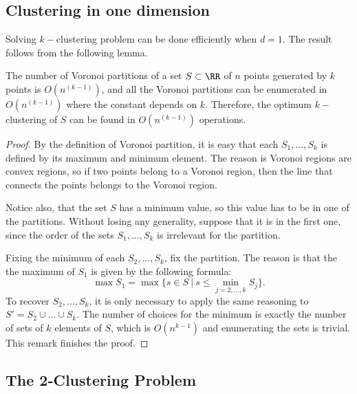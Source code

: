 \subsection{Clustering in one dimension}
\label{sec:subsecOneDimension}

Solving $k-$clustering problem can be done efficiently when $d=1$. The result follows from 
the following lemma.
\begin{lemma}
\label{lem:CountingKClustering}
  The number of Voronoi partitions of a set $S\subset\RR$ of $n$ points 
  generated by $k$ points is $O(n^{(k-1)})$, and all the Voronoi partitions
  can be enumerated in $O(n^{(k-1)})$ where the constant depends on $k$. Therefore,
  the optimum $k-$clustering of $S$ can be found in $O(n^{(k-1)})$ operations.
\end{lemma}
\begin{proof}
  By the definition of Voronoi partition, it is easy that each $S_1,\ldots, S_k$ is 
  defined by its maximum and minimum element. The reason is  Voronoi regions 
  are convex regions, so if two points belong to a Voronoi region, then the line
  that connects the points belongs to the Voronoi region.
  
  Notice also, that the set $S$ has a minimum value, so this value has to be in 
  one of the partitions. Without losing any generality, suppose that it is in the 
  first one, since the order of the sets $S_1,\ldots, S_k$ is irrelevant for the 
  partition.
  
  Fixing the minimum of each $S_2,\ldots, S_k$, fix the partition. The reason is
  that the the maximum of $S_1$ is given by the following formula:
  \begin{equation*}
    \max S_1=\max\{s\in S\ |\ s\le\min_{j=2,\ldots,k} S_j\}.
  \end{equation*}
  To recover $S_2,\ldots, S_k$, it is only necessary to apply the same
  reasoning to $S'=S_2\cup\ldots\cup S_k$. The number of choices for the minimum is
  exactly the number of sets of $k$ elements of $S$, which is
  $O(n^{k-1})$ and enumerating the sets is trivial. This remark finishes the proof.
\end{proof}

\subsection{The 2-Clustering Problem}
\label{sec:sub2Clustering}

